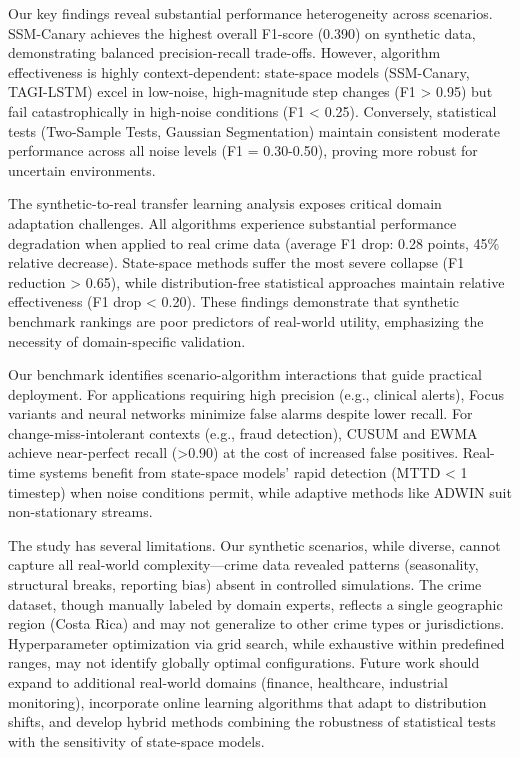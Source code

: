 \documentclass[journal,article,submit,pdftex,moreauthors]{Definitions/mdpi}
\begin{document}
Our key findings reveal substantial performance heterogeneity across scenarios. SSM-Canary achieves the highest overall F1-score (0.390) on synthetic data, demonstrating balanced precision-recall trade-offs. However, algorithm effectiveness is highly context-dependent: state-space models (SSM-Canary, TAGI-LSTM) excel in low-noise, high-magnitude step changes (F1 > 0.95) but fail catastrophically in high-noise conditions (F1 < 0.25). Conversely, statistical tests (Two-Sample Tests, Gaussian Segmentation) maintain consistent moderate performance across all noise levels (F1 = 0.30-0.50), proving more robust for uncertain environments.

The synthetic-to-real transfer learning analysis exposes critical domain adaptation challenges. All algorithms experience substantial performance degradation when applied to real crime data (average F1 drop: 0.28 points, 45\% relative decrease). State-space methods suffer the most severe collapse (F1 reduction > 0.65), while distribution-free statistical approaches maintain relative effectiveness (F1 drop < 0.20). These findings demonstrate that synthetic benchmark rankings are poor predictors of real-world utility, emphasizing the necessity of domain-specific validation.

Our benchmark identifies scenario-algorithm interactions that guide practical deployment. For applications requiring high precision (e.g., clinical alerts), Focus variants and neural networks minimize false alarms despite lower recall. For change-miss-intolerant contexts (e.g., fraud detection), CUSUM and EWMA achieve near-perfect recall (>0.90) at the cost of increased false positives. Real-time systems benefit from state-space models' rapid detection (MTTD < 1 timestep) when noise conditions permit, while adaptive methods like ADWIN suit non-stationary streams.

The study has several limitations. Our synthetic scenarios, while diverse, cannot capture all real-world complexity—crime data revealed patterns (seasonality, structural breaks, reporting bias) absent in controlled simulations. The crime dataset, though manually labeled by domain experts, reflects a single geographic region (Costa Rica) and may not generalize to other crime types or jurisdictions. Hyperparameter optimization via grid search, while exhaustive within predefined ranges, may not identify globally optimal configurations. Future work should expand to additional real-world domains (finance, healthcare, industrial monitoring), incorporate online learning algorithms that adapt to distribution shifts, and develop hybrid methods combining the robustness of statistical tests with the sensitivity of state-space models.
\end{document}

